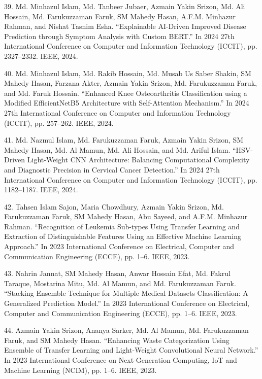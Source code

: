 \documentclass[a4paper,10pt]{article}
\newlength{\cvcolumngapwidth}
\newlength{\cvleftcolumnwidth}
\newlength{\cvrightcolumnwidth}
\newcommand{\cvdurationstyle}[1]{{\small\cvdurationfont\textcolor{cvdurationcolor}{#1}}}
\newlength{\cvafteritemskipamount}
\newlength{\cvparskip}
\newcommand{\cvitem}[2]{
    \begin{minipage}[t]{\cvleftcolumnwidth}
        \raggedleft #1
    \end{minipage}%
    \hspace{\cvcolumngapwidth}%
    \begin{minipage}[t]{\cvrightcolumnwidth}
        \setlength{\parskip}{\cvparskip} #2
    \end{minipage}

    \vspace{\cvafteritemskipamount}
}
\begin{document}
\cvitem{
    \cvdurationstyle{}
}{
39. Md. Minhazul Islam, Md. Tanbeer Jubaer, Azmain Yakin Srizon, Md. Ali Hossain, Md. Farukuzzaman Faruk, SM Mahedy Hasan, A.F.M. Minhazur Rahman, and Nishat Tasnim Esha. “Explainable AI-Driven Improved Disease Prediction through Symptom Analysis with Custom BERT.” In 2024 27th International Conference on Computer and Information Technology (ICCIT), pp. 2327–2332. IEEE, 2024.
}

\cvitem{
    \cvdurationstyle{}
}{
40. Md. Minhazul Islam, Md. Rakib Hossain, Md. Musab Us Saber Shakin, SM Mahedy Hasan, Farzana Akter, Azmain Yakin Srizon, Md. Farukuzzaman Faruk, and Md. Faruk Hossain. “Enhanced Knee Osteoarthritis Classification using a Modified EfficientNetB5 Architecture with Self-Attention Mechanism.” In 2024 27th International Conference on Computer and Information Technology (ICCIT), pp. 257–262. IEEE, 2024.
}

\cvitem{
    \cvdurationstyle{}
}{
41. Md. Nazmul Islam, Md. Farukuzzaman Faruk, Azmain Yakin Srizon, SM Mahedy Hasan, Md. Al Mamun, Md. Ali Hossain, and Md. Ariful Islam. “HSV-Driven Light-Weight CNN Architecture: Balancing Computational Complexity and Diagnostic Precision in Cervical Cancer Detection.” In 2024 27th International Conference on Computer and Information Technology (ICCIT), pp. 1182–1187. IEEE, 2024.
}

\cvitem{
    \cvdurationstyle{}
}{
42. Tahsen Islam Sajon, Maria Chowdhury, Azmain Yakin Srizon, Md. Farukuzzaman Faruk, SM Mahedy Hasan, Abu Sayeed, and A.F.M. Minhazur Rahman. “Recognition of Leukemia Sub-types Using Transfer Learning and Extraction of Distinguishable Features Using an Effective Machine Learning Approach.” In 2023 International Conference on Electrical, Computer and Communication Engineering (ECCE), pp. 1–6. IEEE, 2023.
}

\cvitem{
    \cvdurationstyle{}
}{
43. Nahrin Jannat, SM Mahedy Hasan, Anwar Hossain Efat, Md. Fakrul Taraque, Mostarina Mitu, Md. Al Mamun, and Md. Farukuzzaman Faruk. “Stacking Ensemble Technique for Multiple Medical Datasets Classification: A Generalized Prediction Model.” In 2023 International Conference on Electrical, Computer and Communication Engineering (ECCE), pp. 1–6. IEEE, 2023.
}

\cvitem{
    \cvdurationstyle{}
}{
44. Azmain Yakin Srizon, Ananya Sarker, Md. Al Mamun, Md. Farukuzzaman Faruk, and SM Mahedy Hasan. “Enhancing Waste Categorization Using Ensemble of Transfer Learning and Light-Weight Convolutional Neural Network.” In 2023 International Conference on Next-Generation Computing, IoT and Machine Learning (NCIM), pp. 1–6. IEEE, 2023.
}
\end{document}
